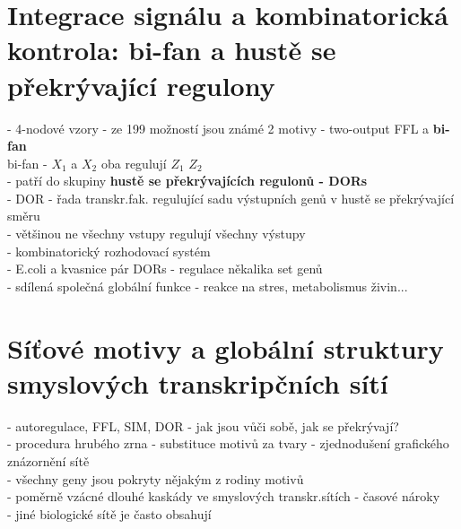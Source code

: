 \documentclass[11pt,a4paper]{report}
\begin{document}
\section{Integrace signálu a kombinatorická kontrola: bi-fan a hustě se překrývající regulony}
- 4-nodové vzory - ze 199 možností jsou známé 2 motivy - two-output FFL a \textbf{bi-fan}\\
\indent bi-fan - $X_1$ a $X_2$ oba regulují $Z_1$ $Z_2$\\
\indent \indent - patří do skupiny \textbf{hustě se překrývajících regulonů - DORs}\\
- DOR - řada transkr.fak. regulující sadu výstupních genů v hustě se překrývající směru\\
\indent - většinou ne všechny vstupy regulují všechny výstupy\\
\indent - kombinatorický rozhodovací systém\\
\indent - E.coli a kvasnice pár DORs - regulace někalika set genů\\
\indent - sdílená společná globální funkce - reakce na stres, metabolismus živin...\\

\section{Síťové motivy a globální struktury smyslových transkripčních sítí}
- autoregulace, FFL, SIM, DOR - jak jsou vůči sobě, jak se překrývají?\\
- procedura hrubého zrna - substituce motivů za tvary - zjednodušení grafického znázornění sítě\\
- všechny geny jsou pokryty nějakým z rodiny motivů\\
- poměrně vzácné dlouhé kaskády ve smyslových transkr.sítích - časové nároky\\
\indent - jiné biologické sítě je často obsahují\\
\end{document}
